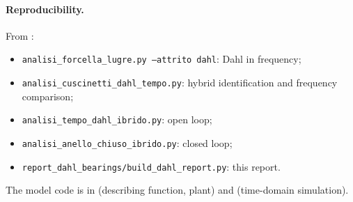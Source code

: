 \documentclass[10pt,a4paper]{article}
\numberwithin{equation}{section}
\begin{document}
\paragraph{Reproducibility.} From :
\begin{itemize}
\item \texttt{analisi\_forcella\_lugre.py --attrito dahl}: Dahl in frequency;
\item \texttt{analisi\_cuscinetti\_dahl\_tempo.py}: hybrid identification and frequency comparison;
\item \texttt{analisi\_tempo\_dahl\_ibrido.py}: open loop;
\item \texttt{analisi\_anello\_chiuso\_ibrido.py}: closed loop;
\item \texttt{report\_dahl\_bearings/build\_dahl\_report.py}: this report.
\end{itemize}
The model code is in  (describing function, plant) and  (time-domain simulation).
\end{document}
